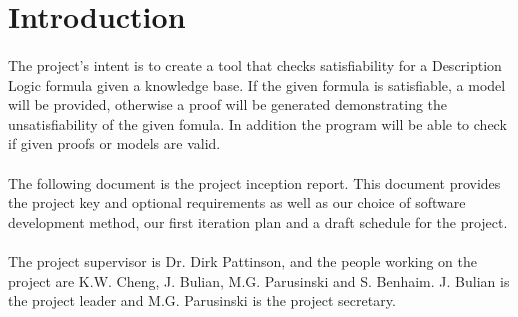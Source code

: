 \documentclass[12pt]{article}
\begin{document}
\section*{Introduction}

\paragraph{} The project's intent is to create a tool that checks satisfiability for a Description Logic formula given a knowledge base. If the given formula is satisfiable, a model will be provided, otherwise a proof will be generated demonstrating the unsatisfiability of the given fomula. In addition the program will be able to check if given proofs or models are valid.

\paragraph{} The following document is the project inception report. This document provides the project key and optional requirements as well as our choice of software development method, our first iteration plan and a draft schedule for the project.

\paragraph{} The project supervisor is Dr. Dirk Pattinson, and the people working on the project
are K.W. Cheng, J. Bulian, M.G. Parusinski and S. Benhaim. J. Bulian is the project leader and M.G. Parusinski is the project secretary.

\pagebreak
\end{document}
